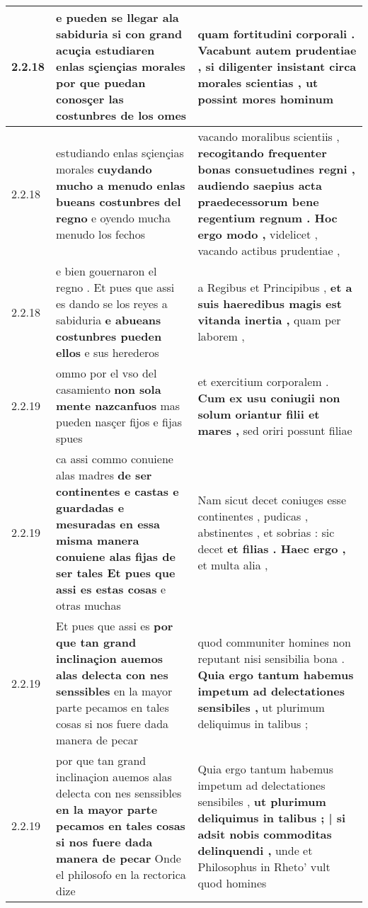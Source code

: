 \begin{tabular}{|p{1cm}|p{6.5cm}|p{6.5cm}|}
2.2.18 & e pueden se llegar ala sabiduria \textbf{ si con grand acuçia estudiaren enlas sçiençias morales } por que puedan conosçer las costunbres de los omes & quam fortitudini corporali . Vacabunt autem prudentiae , \textbf{ si diligenter insistant circa morales scientias , } ut possint mores hominum \\\hline
2.2.18 & estudiando enlas sçiençias morales \textbf{ cuydando mucho a menudo enlas bueans costunbres del regno } e oyendo mucħa menudo los fechos & vacando moralibus scientiis , \textbf{ recogitando frequenter bonas consuetudines regni , audiendo saepius acta praedecessorum bene regentium regnum . Hoc ergo modo , } videlicet , vacando actibus prudentiae , \\\hline
2.2.18 & e bien gouernaron el regno . Et pues que assi es dando se los reyes a sabiduria \textbf{ e abueans costunbres pueden ellos } e sus herederos & a Regibus et Principibus , \textbf{ et a suis haeredibus magis est vitanda inertia , } quam per laborem , \\\hline
2.2.19 & ommo por el vso del casamiento \textbf{ non sola mente nazcanfuos } mas pueden nasçer fijos e fijas spues & et exercitium corporalem . \textbf{ Cum ex usu coniugii non solum oriantur filii et mares , } sed oriri possunt filiae \\\hline
2.2.19 & ca assi commo conuiene alas madres \textbf{ de ser continentes e castas e guardadas e mesuradas en essa misma manera conuiene alas fijas de ser tales Et pues que assi es estas cosas } e otras muchas & Nam sicut decet coniuges esse continentes , pudicas , abstinentes , et sobrias : sic decet \textbf{ et filias . Haec ergo , } et multa alia , \\\hline
2.2.19 & Et pues que assi es \textbf{ por que tan grand inclinaçion auemos alas delecta con nes senssibles } en la mayor parte pecamos en tales cosas si nos fuere dada manera de pecar & quod communiter homines non reputant nisi sensibilia bona . \textbf{ Quia ergo tantum habemus impetum ad delectationes sensibiles , } ut plurimum deliquimus in talibus ; \\\hline
2.2.19 & por que tan grand inclinaçion auemos alas delecta con nes senssibles \textbf{ en la mayor parte pecamos en tales cosas si nos fuere dada manera de pecar } Onde el philosofo en la rectorica dize & Quia ergo tantum habemus impetum ad delectationes sensibiles , \textbf{ ut plurimum deliquimus in talibus ; | si adsit nobis commoditas delinquendi , } unde et Philosophus in Rheto’ vult quod homines \\\hline

\end{tabular}
